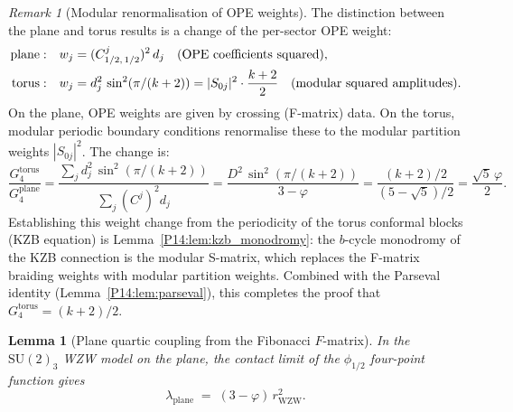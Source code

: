 \documentclass[11pt,a4paper]{article}
\newtheorem{lemma}[theorem]{Lemma}
\theoremstyle{definition}
\theoremstyle{remark}
\newtheorem{remark}[theorem]{Remark}
\newcommand{\vp}{\varphi}
\begin{document}
\begin{remark}[Modular renormalisation of OPE weights]
\label{P14:rem:modular_renorm}
The distinction between the plane and torus results is a change of
the per-sector OPE weight:
\begin{align}
  \text{plane}:&\quad
  w_j = (C^j_{1/2,\,1/2})^2\,d_j
  \quad\text{(OPE coefficients squared)},\notag\\
  \text{torus}:&\quad
  w_j = d_j^2\,\sin^2(\pi/(k+2)) = |S_{0j}|^2\cdot\frac{k+2}{2}
  \quad\text{(modular squared amplitudes)}.
  \label{P14:eq:weight_change}
\end{align}
On the plane, OPE weights are given by crossing (F-matrix) data.
On the torus, modular periodic boundary conditions renormalise
these to the modular partition weights $|S_{0j}|^2$.
The change is:
\begin{equation}
  \frac{G_4^{\mathrm{torus}}}{G_4^{\mathrm{plane}}}
  = \frac{\sum_j d_j^2\,\sin^2(\pi/(k+2))}{\sum_j (C^j)^2 d_j}
  = \frac{D^2\,\sin^2(\pi/(k+2))}{3-\vp}
  = \frac{(k+2)/2}{(5-\sqrt{5})/2}
  = \frac{\sqrt{5}\,\vp}{2}.
  \label{P14:eq:modular_ratio}
\end{equation}
Establishing this weight change from the periodicity of the
torus conformal blocks (KZB equation) is
Lemma~\ref{P14:lem:kzb_monodromy}: the $b$-cycle monodromy of the
KZB connection is the modular S-matrix, which replaces
the F-matrix braiding weights with modular partition weights.
Combined with the Parseval identity (Lemma~\ref{P14:lem:parseval}),
this completes the proof that $G_4^{\mathrm{torus}} = (k+2)/2$.
\end{remark}

\begin{lemma}[Plane quartic coupling from the Fibonacci $F$-matrix]
\label{P14:lem:fmatrix_plane}
In the $\mathrm{SU}(2)_3$ WZW model on the \emph{plane}, the contact
limit of the $\phi_{1/2}$ four-point function gives
\begin{equation}
  \boxed{\lambda_{\mathrm{plane}}
  \;=\; (3-\vp)\,r_{\mathrm{WZW}}^2.}
  \label{P14:eq:lambda_plane}
\end{equation}
\end{lemma}
\end{document}
